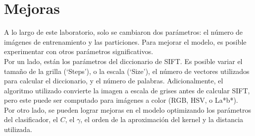 \documentclass[10pt,twocolumn,letterpaper]{article}
\begin{document}


\section{Mejoras}
A lo largo de este laboratorio, solo se cambiaron dos parámetros: el número de imágenes de entrenamiento y las particiones. Para mejorar el modelo, es posible experimentar con otros parámetros significativos. \\
Por un lado, están los parámetros del diccionario de SIFT. Es posible variar el tamaño de la grilla (‘Steps’), o la escala (‘Size’), el número de vectores utilizados para calcular el diccionario, y el número de palabras.  Adicionalmente, el algoritmo utilizado convierte la imagen a escala de grises antes de calcular SIFT, pero este puede ser computado para imágenes a color (RGB, HSV, o La*b*).\\
Por otro lado, se pueden lograr mejoras en el modelo optimizando los parámetros del clasificador, el $C$, el $\gamma$, el orden de la aproximación del kernel y la distancia utilizada.

{\small


}
\end{document}
